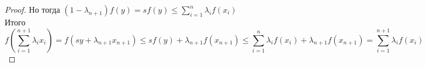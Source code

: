 \begin{proof}
  Но тогда $(1-\lambda_{n+1}) f(y) = s f(y) \le \sum\limits_{i=1}^n \lambda_i f(x_i)$ \\
  Итого
  \[
  f \left( \sum\limits_{i=1}^{n+1} \lambda_i x_i  \right) = f(sy + \lambda_{n+1} x_{n+1}) \le sf(y) + \lambda_{n+1} f(x_{n+1}) \le \sum\limits_{i=1}^n \lambda_i f(x_i) + \lambda_{n+1} f(x_{n+1}) = \sum\limits_{i=1}^{n+1} \lambda_i f(x_i)
  \]
\end{proof}

